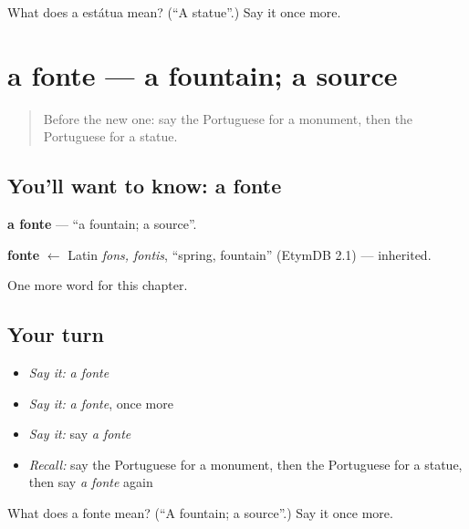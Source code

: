 \begin{tcolorbox}[breakable,colback=teal!4,colframe=teal!35!black,title={Before you move on}]
What does a estátua mean? (\textquotedblleft{}A statue\textquotedblright{}.) Say it once more.
\end{tcolorbox}
\section[a fonte]{a fonte — a fountain; a source}

\label{lesson:PT-C194-fonte}



\begin{quote}
Before the new one: say the Portuguese for a monument, then the Portuguese for a statue.
\end{quote}

\subsection*{You'll want to know: a fonte}
\textbf{a fonte} — \textquotedblleft{}a fountain; a source\textquotedblright{}.

\begin{cousinweb}
\textbf{fonte} $\leftarrow$ Latin \emph{fons, fontis}, \textquotedblleft{}spring, fountain\textquotedblright{} (EtymDB 2.1) — inherited.
\end{cousinweb}

\begin{grammarlens}[title={What you've built}]
One more word for this chapter.
\end{grammarlens}

\subsection*{Your turn}
\begin{itemize}
\raggedright
  \item \emph{Say it:} \emph{a fonte}
  \item \emph{Say it:} \emph{a fonte}, once more
  \item \emph{Say it:} say \emph{a fonte}
  \item \emph{Recall:} say the Portuguese for a monument, then the Portuguese for a statue, then say \emph{a fonte} again
\end{itemize}

\begin{tcolorbox}[breakable,colback=teal!4,colframe=teal!35!black,title={Before you move on}]
What does a fonte mean? (\textquotedblleft{}A fountain; a source\textquotedblright{}.) Say it once more.
\end{tcolorbox}
